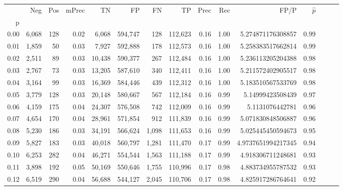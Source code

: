 \begin{tabular}{rrrrrrrrrrrrrrr}
\toprule
{} &     Neg &    Pos & mPrec &       TN &       FP &       FN &       TP &  Prec &   Rec &                  FP/P & $\hat{p}$ \\
p    &         &        &       &          &          &          &          &       &       &                       &           \\
\midrule
0.00 &   6,068 &    128 &  0.02 &    6,068 &  594,747 &      128 &  112,623 &  0.16 &  1.00 &     5.274871176308857 &      0.99 \\
0.01 &   1,859 &     50 &  0.03 &    7,927 &  592,888 &      178 &  112,573 &  0.16 &  1.00 &     5.258383517662814 &      0.99 \\
0.02 &   2,511 &     89 &  0.03 &   10,438 &  590,377 &      267 &  112,484 &  0.16 &  1.00 &     5.236113205204388 &      0.98 \\
0.03 &   2,767 &     73 &  0.03 &   13,205 &  587,610 &      340 &  112,411 &  0.16 &  1.00 &     5.211572402905517 &      0.98 \\
0.04 &   3,164 &     99 &  0.03 &   16,369 &  584,446 &      439 &  112,312 &  0.16 &  1.00 &     5.183510567533769 &      0.98 \\
0.05 &   3,779 &    128 &  0.03 &   20,148 &  580,667 &      567 &  112,184 &  0.16 &  0.99 &      5.14999423508439 &      0.97 \\
0.06 &   4,159 &    175 &  0.04 &   24,307 &  576,508 &      742 &  112,009 &  0.16 &  0.99 &       5.1131076442781 &      0.96 \\
0.07 &   4,654 &    170 &  0.04 &   28,961 &  571,854 &      912 &  111,839 &  0.16 &  0.99 &     5.071830848506887 &      0.96 \\
0.08 &   5,230 &    186 &  0.03 &   34,191 &  566,624 &    1,098 &  111,653 &  0.16 &  0.99 &     5.025445450594673 &      0.95 \\
0.09 &   5,827 &    183 &  0.03 &   40,018 &  560,797 &    1,281 &  111,470 &  0.17 &  0.99 &    4.9737651994217345 &      0.94 \\
0.10 &   6,253 &    282 &  0.04 &   46,271 &  554,544 &    1,563 &  111,188 &  0.17 &  0.99 &     4.918306711248681 &      0.93 \\
0.11 &   3,898 &    192 &  0.05 &   50,169 &  550,646 &    1,755 &  110,996 &  0.17 &  0.98 &     4.883734955787532 &      0.93 \\
0.12 &   6,519 &    290 &  0.04 &   56,688 &  544,127 &    2,045 &  110,706 &  0.17 &  0.98 &     4.825917286764641 &      0.92 \\

\end{tabular}
